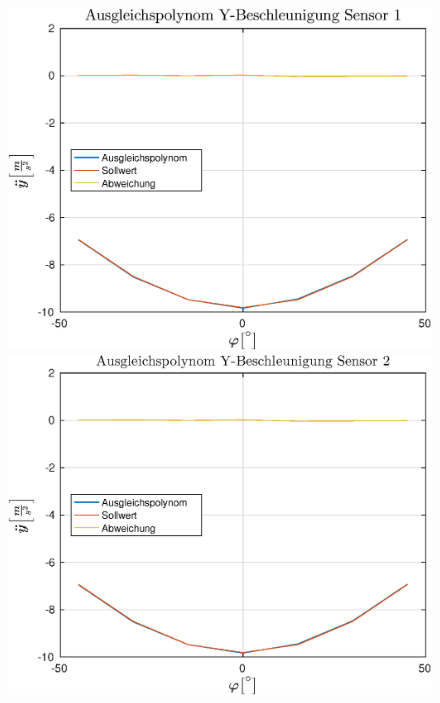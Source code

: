 \vspace*{-\baselineskip}
\begin{figure}[h!]
	\includegraphics[width=0.5\linewidth]{img/Y1__dd___fitted.eps}
	\includegraphics[width=0.5\linewidth]{img/Y2__dd___fitted.eps}
\end{figure}

